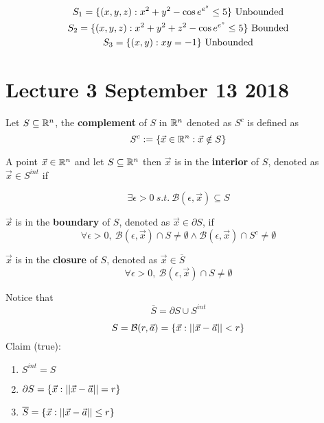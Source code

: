 \documentclass[]{article}
\newcommand{\ball}[2]{\mathcal{B}({#1}, {#2})}
\begin{document}
		\begin{example}
			\begin{gather*}
				S_1 = \{(x,y,z): x^2 + y^2 - \cos{e^{e^z}} \leq 5\} \text{{ Unbounded}}\\
				S_2 = \{(x,y,z): x^2 + y^2 + z^2 - \cos{e^{e^z}} \leq 5\} \text{{ Bounded}}\\
				S_3 = \{(x,y): xy=-1\} \text{{ Unbounded}} \\
			\end{gather*}
		\end{example}
	\section{Lecture 3 September 13 2018}
	
	\begin{definition}
		Let $S \subseteq \mathbb{R}^n$, the \textbf{complement} of $S$ in $\mathbb{R}^n$ denoted as $S^c$ is defined as 
		\[
			S^c:= \{\vec{x} \in \mathbb{R}^n: \vec{x} \notin S\}
		\]
	\end{definition}
	
	\begin{definition}
		A point $\vec{x} \in \mathbb{R}^n$ and let $S \subseteq \mathbb{R}^n$ then $\vec{x}$ is in the \textbf{interior} of $S$, denoted as $\vec{x} \in S^{int}$ if
		
		\[
			\exists \epsilon > 0 \ s.t.\ \ball{\epsilon}{\vec{x}} \subseteq S
		\]
	\end{definition}
	
	\begin{definition}
		$\vec{x}$ is in the \textbf{boundary} of $S$, denoted as $\vec{x} \in \partial S$, if 
		\[
			\forall \epsilon > 0,\ 
			\ball{\epsilon}{\vec{x}} \cap S \neq \emptyset 
			\land 
			\ball{\epsilon}{\vec{x}} \cap S^c \neq \emptyset
		\]
	\end{definition}
	
	\begin{definition}
		$\vec{x}$ is in the \textbf{closure} of $S$, denoted as $\vec{x} \in \overline{S}$
		\[
			\forall \epsilon > 0,\ \ball{\epsilon}{\vec{x}} \cap S \neq \emptyset
		\]
	\end{definition}

	\begin{theorem}
		Notice that 
		\[
			\overline{S} = \partial S \cup S^{int}
		\]
	\end{theorem}
	
	\begin{example}
		\[
			S = \ball{r}{\vec{a}} = \{\vec{x}: \Norm{\vec{x} - \vec{a}} < r\}
		\]
		Claim (true):
		\begin{enumerate}
			\item $S^{int} = S$ 
			\item $\partial S = \{\vec{x}: \vert \vert {\vec{x} - \vec{a}} \vert \vert = r\}$
			\item $\overline{S} = \{\vec{x}: \vert \vert {\vec{x} - \vec{a}} \vert \vert \leq r\} $
		\end{enumerate}
	\end{example}
	
\end{document}
